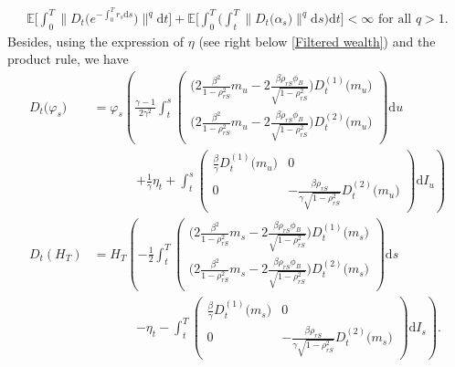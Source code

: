 \documentclass[12,reqno]{amsart}
\numberwithin{equation}{section}
\begin{document}
\begin{align}\label{Integrability of Malliavin derivatives_r and alpha_power}
	\mathbb{E}\Big[\int_{0}^{T}\big\|D_{t}\big(e^{-\int_{0}^{T}r_{s} \mathrm{d}s}\big)\big\|^{q}\mathrm{d}t\Big]+\mathbb{E}\Big[\int_{0}^{T}\Big(\int_{t}^{T}\|D_{t}\big(\alpha_{s}\big)\|^{q}\mathrm{d}s\Big)\mathrm{d}t\Big]<\infty\text{ for all }q>1.
\end{align}
Besides, using the expression of $\eta$ (see right below \eqref{Filtered wealth}) and the product rule, we have
\begin{align*}
	D_{t}\big(\varphi_{s}\big)
	&=\varphi_{s}\left(\frac{\gamma-1}{2\gamma^{2}}\int_{t}^{s}\begin{pmatrix}
		\big(2\frac{\beta^{2}}{1-\rho_{rS}^{2}}m_{u}-2\frac{\beta\rho_{rS}\phi_{B}}{\sqrt{1-\rho_{rS}^{2}}}\big)D_{t}^{(1)}\big(m_{u}\big)\\ \big(2\frac{\beta^{2}}{1-\rho_{rS}^{2}}m_{u}-2\frac{\beta\rho_{rS}\phi_{B}}{\sqrt{1-\rho_{rS}^{2}}}\big)D_{t}^{(2)}\big(m_{u}\big)
	\end{pmatrix}\mathrm{d}u\right.\\
	&\phantom{XXxxx}\left.+\frac{1}{\gamma}\eta_{t}+\int_{t}^{s}\begin{pmatrix}
		\frac{\beta}{\gamma}D_{t}^{(1)}\big(m_{u}\big) & 0\\ 0 & -\frac{\beta\rho_{rS}}{\gamma\sqrt{1-\rho_{rS}^{2}}}D_{t}^{(2)}\big(m_{u}\big)
	\end{pmatrix}\mathrm{d}I_{u}\right)\\
	D_{t}\left(H_{T}\right)
	&=H_{T}\left(-\frac{1}{2}\int_{t}^{T}\begin{pmatrix}
		\big(2\frac{\beta^{2}}{1-\rho_{rS}^{2}}m_{s}-2\frac{\beta\rho_{rS}\phi_{B}}{\sqrt{1-\rho_{rS}^{2}}}\big)D_{t}^{(1)}\big(m_{s}\big)\\ \big(2\frac{\beta^{2}}{1-\rho_{rS}^{2}}m_{s}-2\frac{\beta\rho_{rS}\phi_{B}}{\sqrt{1-\rho_{rS}^{2}}}\big)D_{t}^{(2)}\big(m_{s}\big)
	\end{pmatrix}\mathrm{d}s\right.\\
	&\phantom{XXxxx}\left.-\eta_{t}-\int_{t}^{T}\begin{pmatrix}
		\frac{\beta}{\gamma}D_{t}^{(1)}\big(m_{s}\big) & 0\\ 0 & -\frac{\beta\rho_{rS}}{\gamma\sqrt{1-\rho_{rS}^{2}}}D_{t}^{(2)}\big(m_{s}\big)
	\end{pmatrix}\mathrm{d}I_{s}\right).
\end{align*}
\end{document}
